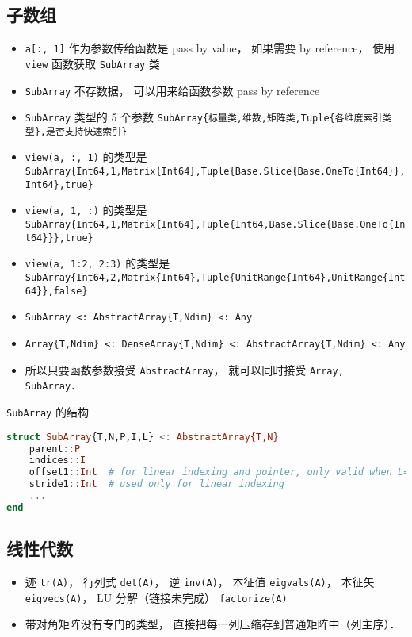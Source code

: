 \subsection{子数组}
\begin{itemize}
\item \verb|a[:, 1]| 作为参数传给函数是 pass by value， 如果需要 by reference， 使用 \verb|view| 函数获取 \verb|SubArray| 类
\item \verb|SubArray| 不存数据， 可以用来给函数参数 pass by reference
\item \verb|SubArray| 类型的 5 个参数 \verb|SubArray{标量类,维数,矩阵类,Tuple{各维度索引类型},是否支持快速索引}|
\item \verb|view(a, :, 1)| 的类型是 \verb|SubArray{Int64,1,Matrix{Int64},Tuple{Base.Slice{Base.OneTo{Int64}},Int64},true}|
\item \verb|view(a, 1, :)| 的类型是 \verb|SubArray{Int64,1,Matrix{Int64},Tuple{Int64,Base.Slice{Base.OneTo{Int64}}},true}|
\item \verb|view(a, 1:2, 2:3)| 的类型是 \verb|SubArray{Int64,2,Matrix{Int64},Tuple{UnitRange{Int64},UnitRange{Int64}},false}|
\item \verb|SubArray <: AbstractArray{T,Ndim} <: Any|
\item \verb|Array{T,Ndim} <: DenseArray{T,Ndim} <: AbstractArray{T,Ndim} <: Any|
\item 所以只要函数参数接受 \verb|AbstractArray|， 就可以同时接受 \verb|Array, SubArray|．
\end{itemize}

\verb|SubArray| 的结构
\begin{lstlisting}[language=julia]
struct SubArray{T,N,P,I,L} <: AbstractArray{T,N}
    parent::P
    indices::I
    offset1::Int  # for linear indexing and pointer, only valid when L==true
    stride1::Int  # used only for linear indexing
    ...
end
\end{lstlisting}

\subsection{线性代数}
\begin{itemize}
\item 迹 \verb|tr(A)|， 行列式 \verb|det(A)|， 逆 \verb|inv(A)|， 本征值 \verb|eigvals(A)|， 本征矢 \verb|eigvecs(A)|， LU 分解（链接未完成） \verb|factorize(A)|
\item 带对角矩阵没有专门的类型， 直接把每一列压缩存到普通矩阵中（列主序）．
\end{itemize}

